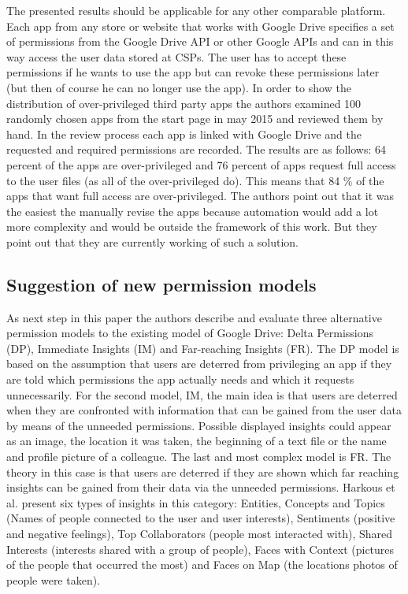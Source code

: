 \documentclass[11pt,twocolumn,a4paper,DIV=calc]{scrartcl}
\begin{document}
The presented results should be applicable for any other comparable platform. Each app from any store or website that works with Google Drive specifies a set of permissions from the Google Drive API or other Google APIs and can in this way access the user data stored at CSPs. The user has to accept these permissions if he wants to use the app but can revoke these permissions later (but then of course he can no longer use the app). In order to show the distribution of over-privileged third party apps the authors examined 100 randomly chosen apps from the start page in may 2015 and reviewed them by hand. 
In the review process each app is linked with Google Drive and the requested and required permissions are recorded. The results are as follows: 64 percent of the apps are over-privileged and 76 percent of apps request full access to the user files (as all of the over-privileged do). This means that 84 \% of the apps that want full access are over-privileged. The authors point out that it was the easiest the manually revise the apps because automation would add a lot more complexity and would be outside the framework of this work. But they point out that they are currently working of such a solution. 
\subsection{Suggestion of new permission models}
As next step in this paper the authors describe and evaluate three alternative permission models to the existing model of Google Drive: Delta Permissions (DP), Immediate Insights (IM) and Far-reaching Insights (FR). The DP model is based on the assumption that users are deterred from privileging an app if they are told which permissions the app actually needs and which it requests unnecessarily. For the second model, IM, the main idea is that users are deterred when they are confronted with information that can be gained from the user data by means of the unneeded permissions. Possible displayed insights could appear as an image, the location it was taken, the beginning of a text file or the name and profile picture of a colleague. The last and most complex model is FR. 
The theory in this case is that users are deterred if they are shown which far reaching insights can be gained from their data via the unneeded permissions. 
Harkous et al. present six types of insights in this category: Entities, Concepts and Topics (Names of people connected to the user and user interests), Sentiments (positive and negative feelings), Top Collaborators (people most interacted with), Shared Interests (interests shared with a group of people), Faces with Context (pictures of the people that occurred the most) and Faces on Map (the locations photos of people were taken).
\end{document}

